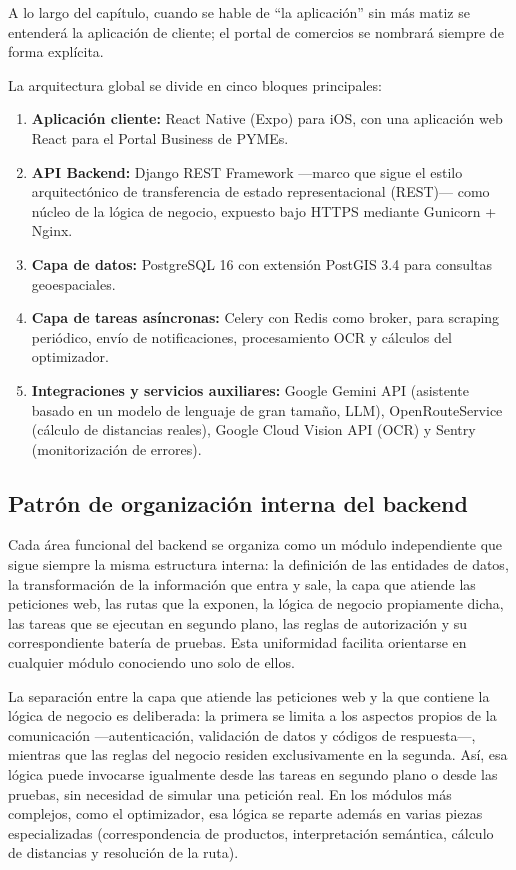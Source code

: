 A lo largo del cap\'itulo, cuando se hable de ``la aplicaci\'on'' sin m\'as matiz se entender\'a la
aplicaci\'on de cliente; el portal de comercios se nombrar\'a siempre de forma expl\'icita.

La arquitectura global se divide en cinco bloques principales:

\begin{enumerate}
  \item \textbf{Aplicaci\'on cliente:} React Native (Expo) para iOS, con una aplicaci\'on
    web React para el Portal Business de PYMEs.
  \item \textbf{API Backend:} Django REST Framework ---marco que sigue el estilo arquitect\'onico
    de transferencia de estado representacional (REST)--- como n\'ucleo de la l\'ogica de negocio,
    expuesto bajo HTTPS mediante Gunicorn + Nginx.
  \item \textbf{Capa de datos:} PostgreSQL 16 con extensi\'on PostGIS 3.4 para consultas
    geoespaciales.
  \item \textbf{Capa de tareas as\'incronas:} Celery con Redis como broker, para scraping
    peri\'odico, env\'io de notificaciones, procesamiento OCR y c\'alculos del optimizador.
  \item \textbf{Integraciones y servicios auxiliares:} Google Gemini API (asistente basado en un
    modelo de lenguaje de gran tama\~no, LLM), OpenRouteService (c\'alculo de distancias reales),
    Google Cloud Vision API (OCR) y Sentry (monitorizaci\'on de errores).
\end{enumerate}

\subsection{Patr\'on de organizaci\'on interna del backend}\label{subsec:patron-backend}

Cada \'area funcional del backend se organiza como un m\'odulo independiente que sigue siempre la
misma estructura interna: la definici\'on de las entidades de datos, la transformaci\'on de la
informaci\'on que entra y sale, la capa que atiende las peticiones web, las rutas que la exponen,
la l\'ogica de negocio propiamente dicha, las tareas que se ejecutan en segundo plano, las reglas
de autorizaci\'on y su correspondiente bater\'ia de pruebas. Esta uniformidad facilita orientarse
en cualquier m\'odulo conociendo uno solo de ellos.

La separaci\'on entre la capa que atiende las peticiones web y la que contiene la l\'ogica de
negocio es deliberada: la primera se limita a los aspectos propios de la comunicaci\'on
---autenticaci\'on, validaci\'on de datos y c\'odigos de respuesta---, mientras que las reglas del
negocio residen exclusivamente en la segunda. As\'i, esa l\'ogica puede invocarse igualmente desde
las tareas en segundo plano o desde las pruebas, sin necesidad de simular una petici\'on real. En
los m\'odulos m\'as complejos, como el optimizador, esa l\'ogica se reparte adem\'as en varias
piezas especializadas (correspondencia de productos, interpretaci\'on sem\'antica, c\'alculo de
distancias y resoluci\'on de la ruta).

